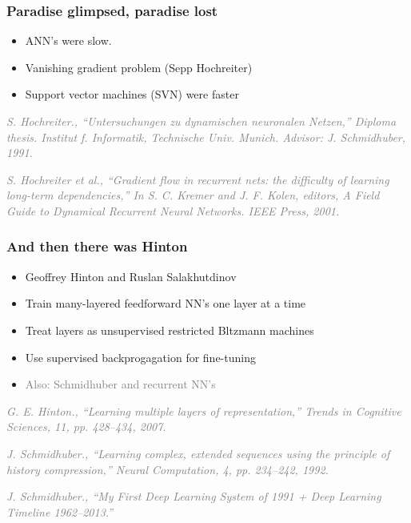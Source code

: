 \documentclass{beamer}
\newcommand\gray[1]{\textcolor{gray}{#1}}
\newcommand\smallgray[1]{\textcolor{gray}{\small\it #1}}
\newcommand\prevwork[1]{\smallgray{#1}}
\begin{document}
\begin{frame}
  \frametitle{Paradise glimpsed, paradise lost}
  \begin{itemize}
  \item ANN's were slow.
  \item Vanishing gradient problem (Sepp Hochreiter)
  \item Support vector machines (SVN) were faster
  \end{itemize}

\prevwork{S. Hochreiter., ``Untersuchungen zu dynamischen neuronalen
  Netzen,'' Diploma thesis. Institut f. Informatik, Technische
  Univ. Munich. Advisor: J. Schmidhuber, 1991.}

\prevwork{S. Hochreiter et al., ``Gradient flow in recurrent nets: the
  difficulty of learning long-term dependencies,'' In S. C. Kremer and
  J. F. Kolen, editors, A Field Guide to Dynamical Recurrent Neural
  Networks. IEEE Press, 2001.}
\end{frame}

\begin{frame}
  \frametitle{And then there was Hinton}
  \begin{itemize}
  \item Geoffrey Hinton and Ruslan Salakhutdinov
  \item Train many-layered feedforward NN's one layer at a time
  \item Treat layers as unsupervised restricted Bltzmann machines
  \item Use supervised backprogagation for fine-tuning
  \item \gray{Also: Schmidhuber and recurrent NN's}
  \end{itemize}

\prevwork{G. E. Hinton., ``Learning multiple layers of
  representation,'' Trends in Cognitive Sciences, 11, pp. 428–434,
  2007.}

\prevwork{J. Schmidhuber., ``Learning complex, extended sequences using
  the principle of history compression,'' Neural Computation, 4,
  pp. 234–242, 1992.}

\prevwork{J. Schmidhuber., ``My First Deep Learning System of 1991 +
  Deep Learning Timeline 1962–2013.''}
\end{frame}
\end{document}
